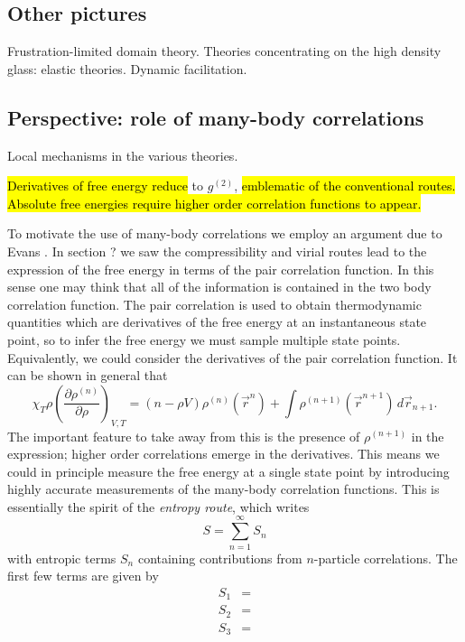 \subsection{Other pictures}

Frustration-limited domain theory.
Theories concentrating on the high density glass: elastic theories.
Dynamic facilitation.

\subsection{Perspective: role of many-body correlations}

Local mechanisms in the various theories.

\hl{Derivatives of free energy reduce} to $g^{(2)}$,\hl{ emblematic of the conventional routes.
Absolute free energies require higher order correlation functions to appear.}

To motivate the use of many-body correlations we employ an argument due to Evans \cite{EvansPrivate2019}.
In section ? we saw the compressibility and virial routes lead to the expression of the free energy in terms of the pair correlation function.
In this sense one may think that all of the information is contained in the two body correlation function.
The pair correlation is used to obtain thermodynamic quantities which are derivatives of the free energy at an instantaneous state point, so to infer the free energy we must sample multiple state points.
Equivalently, we could consider the derivatives of the pair correlation function.
It can be shown in general that \cite{Santos2016}
\begin{equation}
  \chi_T \rho
  \left( \frac{\partial \rho^{(n)}}{\partial \rho} \right)_{V,T}
  =
  (n - \rho V) \rho^{(n)}(\vec{r}^n)
  + \int \rho^{(n+1)}(\vec{r}^{n+1}) \, d\vec{r}_{n+1}.
\end{equation}
The important feature to take away from this is the presence of $\rho^{(n+1)}$ in the expression; higher order correlations emerge in the derivatives.
This means we could in principle measure the free energy at a single state point by introducing highly accurate measurements of the many-body correlation functions.
This is essentially the spirit of the \emph{entropy route}, which writes \cite{WallaceJCP1987}
\begin{equation}
  S = \sum_{n=1}^\infty S_n
\end{equation}
with entropic terms $S_n$ containing contributions from $n$-particle correlations.
The first few terms are given by
\begin{subequations}
  \begin{align}
    S_1
    &=
    \\
    S_2
    &=
    \\
    S_3
    &=
  \end{align}
\end{subequations}

